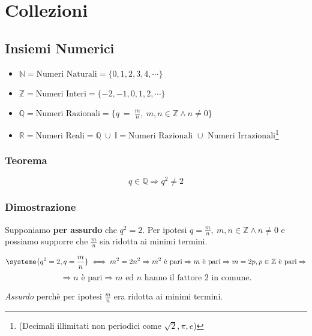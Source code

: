 \section{Collezioni}
\subsection{Insiemi Numerici}
    \begin{itemize}
        \item $\mathbb{N} = \text{Numeri Naturali} = \{0,1,2,3,4,\cdots\}$
        \item $\mathbb{Z} = \text{Numeri Interi} = \{-2,-1,0,1,2,\cdots\}$
        \item $\mathbb{Q} = \text{Numeri Razionali} = \{q\ =\ \frac{m}{n},\ m,n \in \mathbb{Z} \land n \neq 0\}$
        \item $\mathbb{R} = \text{Numeri Reali} = \mathbb{Q}\ \cup\ \mathbb{I} = \text{Numeri Razionali } \cup \text{ Numeri Irrazionali}$\footnote{(Decimali illimitati non periodici come $\sqrt{2}, \pi, e$)}\newline 
    \end{itemize}
    \subsubsection*{Teorema}
    \begin{Large}
        \begin{equation*}
            q \in \mathbb{Q} \Rightarrow q^2 \neq 2
        \end{equation*}
    \end{Large}
    \subsubsection*{Dimostrazione}
        Supponiamo \textbf{per assurdo} che $q^2 = 2$.
        Per ipotesi $q = \frac{m}{n},\ m,n \in \mathbb{Z} \land n \neq 0$ e possiamo supporre che
        $\frac{m}{n}$ sia ridotta ai minimi termini.
        \begin{Large}
            \[
                \systeme{q^2=2,q=\frac{m}{n}} 
                    \iff m^2 = 2n^2
                    \Rightarrow m^2\ \text{è pari} \Rightarrow m\ \text{è pari}
                    \Rightarrow m = 2p, p \in \mathbb{Z} \text{ è pari}\Rightarrow\]
            \[
                \Rightarrow n \text{ è pari}\Rightarrow m \text{ ed } n \text{ hanno il fattore } 2 \text{ in comune}.
            \]\newline
        \end{Large}
        \textit{Assurdo} perchè per ipotesi $\frac{m}{n}$ era ridotta ai minimi termini.
